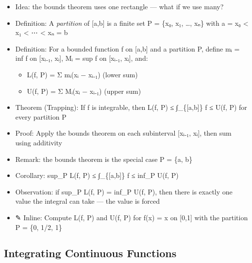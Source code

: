 \documentclass[
  10pt,
  letterpaper,
]{scrbook}
\providecommand{\tightlist}{%
  \setlength{\itemsep}{0pt}\setlength{\parskip}{0pt}}
\begin{document}
\begin{itemize}
\tightlist
\item
  Idea: the bounds theorem uses one rectangle --- what if we use many?
\item
  Definition: A \emph{partition} of {[}a,b{]} is a finite set P = \{x₀,
  x₁, \ldots, xₙ\} with a = x₀ \textless{} x₁ \textless{} ⋯ \textless{}
  xₙ = b
\item
  Definition: For a bounded function f on {[}a,b{]} and a partition P,
  define mᵢ = inf f on {[}xᵢ₋₁, xᵢ{]}, Mᵢ = sup f on {[}xᵢ₋₁, xᵢ{]},
  and:

  \begin{itemize}
  \tightlist
  \item
    L(f, P) = Σ mᵢ(xᵢ − xᵢ₋₁) (lower sum)
  \item
    U(f, P) = Σ Mᵢ(xᵢ − xᵢ₋₁) (upper sum)
  \end{itemize}
\item
  Theorem (Trapping): If f is integrable, then L(f, P) ≤
  ∫\_\{{[}a,b{]}\} f ≤ U(f, P) for every partition P
\item
  Proof: Apply the bounds theorem on each subinterval {[}xᵢ₋₁, xᵢ{]},
  then sum using additivity
\item
  Remark: the bounds theorem is the special case P = \{a, b\}
\item
  Corollary: sup\_P L(f, P) ≤ ∫\_\{{[}a,b{]}\} f ≤ inf\_P U(f, P)
\item
  Observation: if sup\_P L(f, P) = inf\_P U(f, P), then there is exactly
  one value the integral can take --- the value is forced
\item
  ✎ Inline: Compute L(f, P) and U(f, P) for f(x) = x on {[}0,1{]} with
  the partition P = \{0, 1/2, 1\}
\end{itemize}

\subsection{Integrating Continuous
Functions}\label{integrating-continuous-functions}
\end{document}
